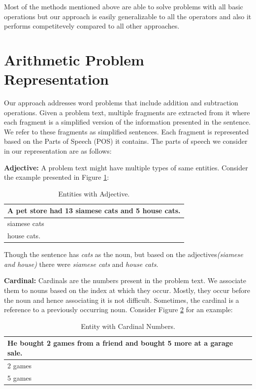 \documentclass[11pt]{article}
\begin{document}
Most of the methods mentioned above are able to solve problems with all basic operations but our approach is easily generalizable to all the operators and also it performs competitevely compared to all other approaches. 

\section{Arithmetic Problem Representation}\label{sec:problemrepresentation}

Our approach addresses word problems that include addition and subtraction operations. Given a problem text, multiple fragments are extracted from it  where each fragment is a simplified version of the information presented in the sentence. We refer to these fragments as simplified sentences. Each fragment is represented based on the Parts of Speech (POS) it contains. The parts of speech we consider in our representation are as follows:


\textbf{Adjective:} A problem text might have multiple types of same entities. Consider the example presented in Figure \ref{figure:2}:

 \begin{table}[h!]
\centering
\begin{tabular}{ | m{25em} | }
\hline
 \textbf{A pet store had 13 siamese cats and 5 house cats.}\\
\hline
 siamese cats\\
\hline
house cats.\\
\hline
\end{tabular}
\caption{Entities with Adjective.}
\label{figure:2}
\end{table}

Though the sentence has \textit{cats} as the noun, but based on the adjectives\textit{(siamese and house)} there were \textit{siamese cats} and \textit{house cats}.
\vspace{4mm}

\textbf{Cardinal:} Cardinals are the numbers present in the problem text. We associate them to nouns based on the index at which they occur. Mostly, they occur before the noun and hence associating it is not difficult. Sometimes, the cardinal is a reference to a previously occurring noun. Consider Figure \ref{figure:3} for an example:

\begin{table}[h!]
\centering
\begin{tabular}{ | m{25em} | }
\hline
\textbf{He bought 2 games from a friend and bought 5 more at a garage sale.}\\
\hline
2 games\\
\hline
5 games\\
\hline
\end{tabular}
\caption{Entity with Cardinal Numbers.}
\label{figure:3}
\end{table}
\end{document}
